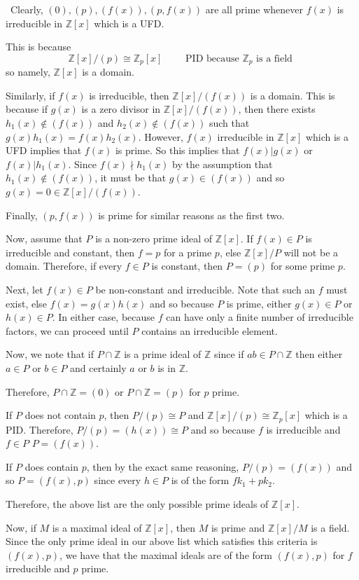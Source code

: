 \documentclass[12pt]{AlgebraQual}
\begin{document}
\begin{solution}$\,$
 Clearly, $(0), (p),(f(x)),(p,f(x))$ are all prime whenever $f(x)$ is irreducible in $\mathbb{Z}[x]$ which is a UFD.

This is because $$\mathbb{Z}[x]/(p)\cong\mathbb{Z}_p[x]\qquad\text{ PID because }\mathbb{Z}_p\text{ is a field }$$ so namely, $\mathbb{Z}[x]$ is a domain.

Similarly, if $f(x)$ is irreducible, then $\mathbb{Z}[x]/(f(x))$ is a domain. This is because if $g(x)$ is a zero divisor in $\mathbb{Z}[x]/(f(x))$, then there exists $h_1(x)\notin (f(x))$ and $h_2(x)\notin (f(x))$ such that $g(x)h_1(x)=f(x)h_2(x)$. However, $f(x)$ irreducible in $\mathbb{Z}[x]$ which is a UFD implies that $f(x)$ is prime. So this implies that $f(x)|g(x)$ or $f(x)|h_1(x)$. Since $f(x)\nmid h_1(x)$ by the assumption that $h_1(x)\notin(f(x))$, it must be that $g(x)\in(f(x))$ and so $g(x)=0\in\mathbb{Z}[x]/(f(x))$.

Finally, $(p,f(x))$ is prime for similar reasons as the first two.

Now, assume that $P$ is a non-zero prime ideal of $\mathbb{Z}[x]$. If $f(x)\in P$ is irreducible and constant, then $f=p$ for a prime $p$, else $\mathbb{Z}[x]/P$ will not be a domain. Therefore, if every $f\in P$ is constant, then $P=(p)$ for some prime $p.$

Next, let $f(x)\in P$ be non-constant and irreducible. Note that such an $f$ must exist, else $f(x)=g(x)h(x)$ and so because $P$ is prime, either $g(x)\in P$ or $h(x)\in P$. In either case, because $f$ can have only a finite number of irreducible factors, we can proceed until $P$ contains an irreducible element.

Now, we note that if $P\cap\mathbb{Z}$ is a prime ideal of $\mathbb{Z}$ since if $ab\in P\cap\mathbb{Z}$ then either $a\in P$ or $b\in P$ and certainly $a$ or $b$ is in $\mathbb{Z}$.

Therefore, $P\cap\mathbb{Z}=(0)$ or $P\cap\mathbb{Z}=(p)$ for $p$ prime.

If $P$ does not contain $p$, then $P/(p)\cong P$ and $\mathbb{Z}[x]/(p)\cong\mathbb{Z}_p[x]$ which is a PID. Therefore, $P/(p)=(h(x))\cong P$ and so because $f$ is irreducible and $f\in P$ $P=(f(x))$.

If $P$ does contain $p$, then by the exact same reasoning, $P/(p)=(f(x))$ and so $P=(f(x),p)$ since every $h\in P$ is of the form $fk_1+pk_2$.

Therefore, the above list are the only possible prime ideals of $\mathbb{Z}[x].$

 Now, if $M$ is a maximal ideal of $\mathbb{Z}[x]$, then $M$ is prime and $\mathbb{Z}[x]/M$ is a field. Since the only prime ideal in our above list which satisfies this criteria is $(f(x),p)$, we have that the maximal ideals are of the form $(f(x),p)$ for $f$ irreducible and $p$ prime.
\end{solution}
\newpage
\end{document}
